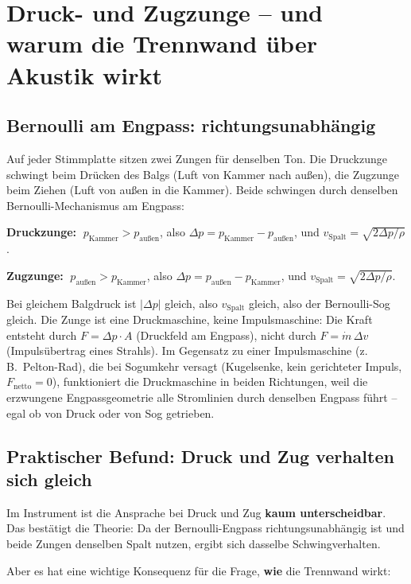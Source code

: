 \documentclass[11pt,a4paper]{article}
\begin{document}
\section{Druck- und Zugzunge -- und warum die Trennwand über Akustik wirkt}

\subsection{Bernoulli am Engpass: richtungsunabhängig}

Auf jeder Stimmplatte sitzen zwei Zungen für denselben Ton. Die Druckzunge schwingt beim Drücken des Balgs (Luft von Kammer nach außen), die Zugzunge beim Ziehen (Luft von außen in die Kammer). Beide schwingen durch denselben Bernoulli-Mechanismus am Engpass:

\textbf{Druckzunge:} $\;p_\text{Kammer} > p_\text{außen}$, also $\Delta p = p_\text{Kammer} - p_\text{außen}$, und $v_\text{Spalt} = \sqrt{2\Delta p/\rho}$.

\textbf{Zugzunge:} $\;p_\text{außen} > p_\text{Kammer}$, also $\Delta p = p_\text{außen} - p_\text{Kammer}$, und $v_\text{Spalt} = \sqrt{2\Delta p/\rho}$.

Bei gleichem Balgdruck ist $|\Delta p|$ gleich, also $v_\text{Spalt}$ gleich, also der Bernoulli-Sog gleich. Die Zunge ist eine Druckmaschine, keine Impulsmaschine: Die Kraft entsteht durch $F = \Delta p \cdot A$ (Druckfeld am Engpass), nicht durch $F = \dot{m}\,\Delta v$ (Impulsübertrag eines Strahls). Im Gegensatz zu einer Impulsmaschine (z.\,B.\ Pelton-Rad), die bei Sogumkehr versagt (Kugelsenke, kein gerichteter Impuls, $F_\text{netto} = 0$), funktioniert die Druckmaschine in beiden Richtungen, weil die erzwungene Engpassgeometrie alle Stromlinien durch denselben Engpass führt -- egal ob von Druck oder von Sog getrieben.

\subsection{Praktischer Befund: Druck und Zug verhalten sich gleich}

Im Instrument ist die Ansprache bei Druck und Zug \textbf{kaum unterscheidbar}. Das bestätigt die Theorie: Da der Bernoulli-Engpass richtungsunabhängig ist und beide Zungen denselben Spalt nutzen, ergibt sich dasselbe Schwingverhalten.

Aber es hat eine wichtige Konsequenz für die Frage, \textbf{wie} die Trennwand wirkt:
\end{document}
